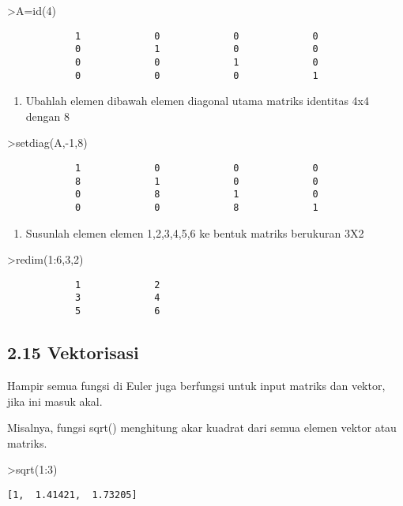 \documentclass[
]{book}
\providecommand{\tightlist}{%
  \setlength{\itemsep}{0pt}\setlength{\parskip}{0pt}}
\begin{document}
\textgreater A=id(4)

\begin{verbatim}
            1             0             0             0 
            0             1             0             0 
            0             0             1             0 
            0             0             0             1 
\end{verbatim}

\begin{enumerate}
\def\labelenumi{\arabic{enumi}.}
\setcounter{enumi}{1}
\tightlist
\item
  Ubahlah elemen dibawah elemen diagonal utama matriks identitas 4x4 dengan 8
\end{enumerate}

\textgreater setdiag(A,-1,8)

\begin{verbatim}
            1             0             0             0 
            8             1             0             0 
            0             8             1             0 
            0             0             8             1 
\end{verbatim}

\begin{enumerate}
\def\labelenumi{\arabic{enumi}.}
\setcounter{enumi}{2}
\tightlist
\item
  Susunlah elemen elemen 1,2,3,4,5,6 ke bentuk matriks berukuran 3X2
\end{enumerate}

\textgreater redim(1:6,3,2)

\begin{verbatim}
            1             2 
            3             4 
            5             6 
\end{verbatim}

\subsection{2.15 Vektorisasi}\label{vektorisasi}

Hampir semua fungsi di Euler juga berfungsi untuk input matriks dan vektor, jika ini masuk akal.

Misalnya, fungsi sqrt() menghitung akar kuadrat dari semua elemen vektor atau matriks.

\textgreater sqrt(1:3)

\begin{verbatim}
[1,  1.41421,  1.73205]
\end{verbatim}
\end{document}
